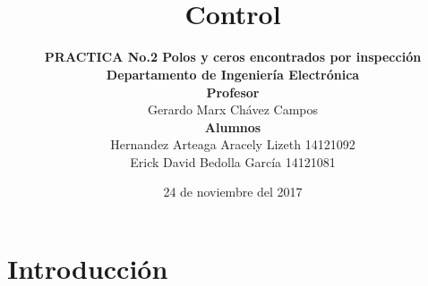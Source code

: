 \documentclass[12pt,letterpaper]{IEEEtran}
\begin{document}
	\title{ \\ \sc\textbf{Control}}
	\date{24 de noviembre del 2017}
	\author{ \textbf{PRACTICA No.2 Polos y ceros encontrados por inspección} \\\textbf{ Departamento de Ingeniería Electrónica} \\\textbf{Profesor} \\Gerardo Marx Chávez Campos \\ \textbf{Alumnos}  \\ Hernandez Arteaga Aracely Lizeth 14121092 \\ Erick David Bedolla García 14121081}
	\maketitle
	\section{Introducción}
	
\end{document}

